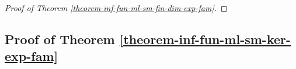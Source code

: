 \begin{proof}[Proof of Theorem \ref{theorem-inf-fun-ml-sm-fin-dim-exp-fam}]
\end{proof}



\subsection{Proof of Theorem \ref{theorem-inf-fun-ml-sm-ker-exp-fam}} \label{proof-theorem-inf-fun-ml-sm-ker-exp-fam}

